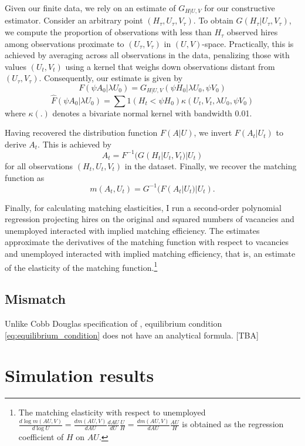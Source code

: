 \documentclass[12pt]{article}
\begin{document}
Given our finite data, we rely on an estimate of $G_{H|U,V}$ for our constructive estimator. Consider an arbitrary point $(H_\tau, U_\tau, V_\tau)$. To obtain $G(H_\tau|U_\tau, V_\tau)$, we compute the proportion of observations with less than $H_\tau$ observed hires among observations proximate to $(U_\tau, V_\tau)$ in $(U, V)$-space. Practically, this is achieved by averaging across all observations in the data, penalizing those with values $(U_t, V_t)$ using a kernel that weighs down observations distant from $(U_\tau, V_\tau)$. Consequently, our estimate is given by
\[
F(\psi A_0|\lambda U_0) = G_{H|U,V}(\psi H_0|\lambda U_0, \psi V_0)
\]
\[
\hat{F}(\psi A_0|\lambda U_0) = \sum 1(H_t < \psi H_0) \kappa(U_t, V_t, \lambda U_0, \psi V_0)
\]
where $\kappa(.)$ denotes a bivariate normal kernel with bandwidth 0.01.

Having recovered the distribution function $F(A|U)$, we invert $F(A_t|U_t)$ to derive $A_t$. This is achieved by
\[
A_t = F^{-1}(G(H_t|U_t, V_t)|U_t)
\]
for all observations $(H_t, U_t, V_t)$ in the dataset. Finally, we recover the matching function as
\[
m(A_t, U_t) = G^{-1}(F(A_t|U_t)|U_t).
\]


Finally, for calculating matching elasticities, I run a second-order polynomial regression projecting hires on the original and squared numbers of vacancies and unemployed interacted with implied matching efficiency.
The estimates approximate the derivatives of the matching function with respect to vacancies and unemployed interacted with implied matching efficiency, that is, an estimate of
the elasticity of the matching function.\footnote{The matching elasticity with respect to unemployed $\frac{d \log m(AU,V)}{d \log U}=\frac{d m(AU,V)}{d AU}\frac{d AU}{dU}\frac{U}{H}=\frac{d m(AU,V)}{d AU}\frac{AU}{H}$ is obtained as the regression coefficient of $H$ on $AU$.}

\subsection{Mismatch}\label{sec:mismatch_computation}

Unlike Cobb Douglas specification of \cite{csahin2014mismatch}, equilibrium condition \eqref{eq:equilibrium_condition} does not have an analytical formula. [TBA]


\section{Simulation results}\label{sec:monte_carlo}
\end{document}
